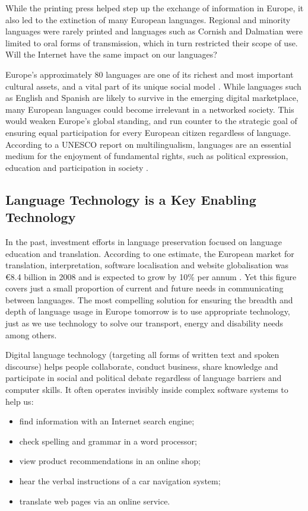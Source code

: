\begin{multicols}{2}
While the printing press helped step up the exchange of information in Europe, it also led to the extinction of many European languages. Regional and minority languages were rarely printed and languages such as Cornish and Dalmatian were limited to oral forms of transmission, which in turn restricted their scope of use. Will the Internet have the same impact on our languages?

Europe’s approximately 80 languages are one of its richest and most important cultural assets, and a vital part of its unique social model \cite{EC2}. While languages such as English and Spanish are likely to survive in the emerging digital marketplace, many European languages could become irrelevant in a networked society. This would weaken Europe’s global standing, and run counter to the strategic goal of ensuring equal participation for every European citizen regardless of language. According to a UNESCO report on multilingualism, languages are an essential medium for the enjoyment of fundamental rights, such as political expression, education and participation in society \cite{Unesco1}.

\subsection{Language Technology is a Key Enabling Technology}

In the past, investment efforts in language preservation focused on language education and translation. According to one estimate, the European market for translation, interpretation, software localisation and website globalisation was €8.4 billion in 2008 and is expected to grow by 10\% per annum \cite{EC3}. Yet this figure covers just a small proportion of current and future needs in communicating between languages. The most compelling solution for ensuring the breadth and depth of language usage in Europe tomorrow is to use appropriate technology, just as we use technology to solve our transport, energy and disability needs among others.

Digital language technology (targeting all forms of written text and spoken discourse) helps people collaborate, conduct business, share knowledge and participate in social and political debate regardless of language barriers and computer skills. It often operates invisibly inside complex software systems to help us:
\begin{itemize}
\item find information with an Internet search engine;
\item check spelling and grammar in a word processor;
\item view product recommendations in an online shop;
\item hear the verbal instructions of a car navigation system;
\item translate web pages via an online service.
\end{itemize}


\end{multicols}
